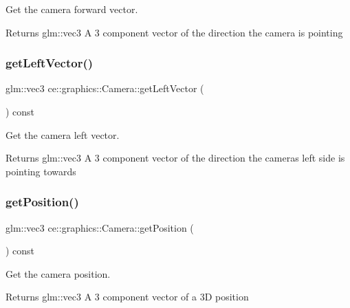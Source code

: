 Get the camera forward vector. 

\begin{DoxyReturn}{Returns}
glm\+::vec3 A 3 component vector of the direction the camera is pointing 
\end{DoxyReturn}
\mbox{\label{classce_1_1graphics_1_1_camera_ad71aace8ffc9499b0997fc92d7ba596a}} 
\subsubsection{\texorpdfstring{get\+Left\+Vector()}{getLeftVector()}}
{\footnotesize\ttfamily glm\+::vec3 ce\+::graphics\+::\+Camera\+::get\+Left\+Vector (\begin{DoxyParamCaption}{ }\end{DoxyParamCaption}) const}



Get the camera left vector. 

\begin{DoxyReturn}{Returns}
glm\+::vec3 A 3 component vector of the direction the cameras left side is pointing towards 
\end{DoxyReturn}
\mbox{\label{classce_1_1graphics_1_1_camera_aa0850a9ff6687843d2a5461299df774e}} 
\subsubsection{\texorpdfstring{get\+Position()}{getPosition()}}
{\footnotesize\ttfamily glm\+::vec3 ce\+::graphics\+::\+Camera\+::get\+Position (\begin{DoxyParamCaption}{ }\end{DoxyParamCaption}) const}



Get the camera position. 

\begin{DoxyReturn}{Returns}
glm\+::vec3 A 3 component vector of a 3D position 
\end{DoxyReturn}
\mbox{\label{classce_1_1graphics_1_1_camera_afa4fe84ad40fcea3a01e68c457b20e37}} 
